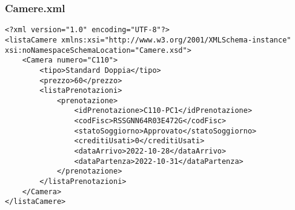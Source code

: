 \documentclass [a4paper, 12pt]{book}
\begin{document}
\subsubsection{Camere.xml}
\begin{lstlisting}[style=XML] 	
<?xml version="1.0" encoding="UTF-8"?>
<listaCamere xmlns:xsi="http://www.w3.org/2001/XMLSchema-instance" xsi:noNamespaceSchemaLocation="Camere.xsd">
    <Camera numero="C110">
        <tipo>Standard Doppia</tipo>
        <prezzo>60</prezzo>
        <listaPrenotazioni>
            <prenotazione>
                <idPrenotazione>C110-PC1</idPrenotazione>
                <codFisc>RSSGNN64R03E472G</codFisc>
                <statoSoggiorno>Approvato</statoSoggiorno>
                <creditiUsati>0</creditiUsati>
                <dataArrivo>2022-10-28</dataArrivo>
                <dataPartenza>2022-10-31</dataPartenza>
            </prenotazione>
        </listaPrenotazioni>
    </Camera>
</listaCamere>
\end{lstlisting}
\end{document}
